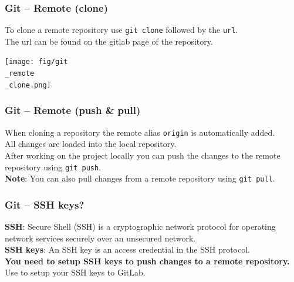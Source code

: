 \documentclass{beamer}
\begin{document}
\begin{frame}
  \frametitle{Git -- Remote (clone)}
  To clone a remote repository use \texttt{git clone} followed by the \texttt{url}.\\
  The url can be found on the gitlab page of the repository.\\
  \begin{center}
    \texttt{[image: fig/git\\\_remote\\\_clone.png]}
  \end{center}
\end{frame}
\begin{frame}
  \frametitle{Git -- Remote (push \& pull)}
  When cloning a repository the remote alias \texttt{origin} is automatically added.\\
  All changes are loaded into the local repository.\\
  \vspace{5mm}
  After working on the project locally you can push the changes to the remote repository using \texttt{git push}.\\
  \vspace{5mm}
  \textbf{Note}: You can also pull changes from a remote repository using \texttt{git pull}.\\
\end{frame}
\begin{frame}
  \frametitle{Git -- SSH keys?}
  \textbf{SSH}: Secure Shell (SSH) is a cryptographic network protocol for operating network services securely over an unsecured network.\\
  \vspace{5mm}
  \textbf{SSH keys}: An SSH key is an access credential in the SSH protocol.\\
  \vspace{5mm}
  \textbf{You need to setup SSH keys to push changes to a remote repository.}\\
  \vspace{5mm}
  Use  to setup  your SSH keys to GitLab.\\
\end{frame}
\end{document}
